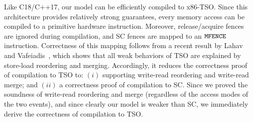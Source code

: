 Like C18/C++17, our model can be efficiently compiled to x86-TSO.
Since this architecture provides relatively strong guarantees,
every memory access can be compiled to a primitive hardware instruction.
Moreover, release/acquire fences are ignored during compilation,
and SC fences are mapped to an $\texttt{MFENCE}$ instruction.
Correctness of this mapping follows from a recent result by Lahav and Vafeiadis~\cite{fm16},
which shows that all weak behaviors of TSO are explained by store-load reordering and merging.
Accordingly, it reduces the correctness proof of compilation to TSO to:
$(i)$ supporting write-read reordering and write-read merge;
and $(ii)$ a correctness proof of compilation to SC.
Since we proved the soundness of write-read reordering and merge 
(regardless of the access modes of the two events),
and since clearly our model is weaker than SC,
we immediately derive the correctness of compilation to TSO.


